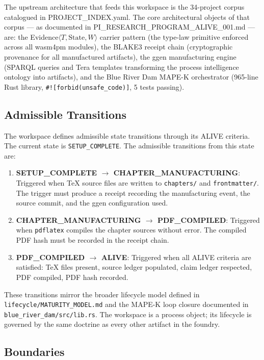 The upstream architecture that feeds this workspace is the 34-project corpus catalogued in
PROJECT\_INDEX.yaml. The core architectural objects of that corpus --- as documented in
PI\_RESEARCH\_PROGRAM\_ALIVE\_001.md --- are: the Evidence$\langle T, \text{State}, W\rangle$
carrier pattern (the type-law primitive enforced across all wasm4pm modules), the BLAKE3
receipt chain (cryptographic provenance for all manufactured artifacts), the ggen
manufacturing engine (SPARQL queries and Tera templates transforming the process intelligence
ontology into artifacts), and the Blue River Dam MAPE-K orchestrator (965-line Rust library,
\texttt{\#![forbid(unsafe\_code)]}, 5 tests passing).

\subsection{Admissible Transitions}
\label{sec:phd-thesis-arch-transitions}

The workspace defines admissible state transitions through its ALIVE criteria. The current
state is \texttt{SETUP\_COMPLETE}. The admissible transitions from this state are:

\begin{enumerate}
  \item \textbf{SETUP\_COMPLETE $\to$ CHAPTER\_MANUFACTURING}: Triggered when TeX source
    files are written to \texttt{chapters/} and \texttt{frontmatter/}. The trigger must
    produce a receipt recording the manufacturing event, the source commit, and the ggen
    configuration used.
  \item \textbf{CHAPTER\_MANUFACTURING $\to$ PDF\_COMPILED}: Triggered when
    \texttt{pdflatex} compiles the chapter sources without error. The compiled PDF hash
    must be recorded in the receipt chain.
  \item \textbf{PDF\_COMPILED $\to$ ALIVE}: Triggered when all ALIVE criteria are satisfied:
    TeX files present, source ledger populated, claim ledger respected, PDF compiled, PDF
    hash recorded.
\end{enumerate}

These transitions mirror the broader lifecycle model defined in
\texttt{lifecycle/MATURITY\_MODEL.md} and the MAPE-K loop closure documented in
\texttt{blue\_river\_dam/src/lib.rs}. The workspace is a process object; its lifecycle is
governed by the same doctrine as every other artifact in the foundry.

\subsection{Boundaries}
\label{sec:phd-thesis-arch-boundaries}

